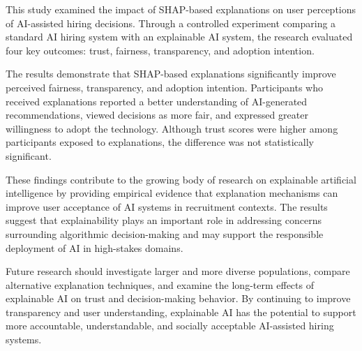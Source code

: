 \documentclass[conference]{IEEEtran}
\begin{document}
This study examined the impact of SHAP-based explanations on user perceptions of AI-assisted hiring decisions. Through a controlled experiment comparing a standard AI hiring system with an explainable AI system, the research evaluated four key outcomes: trust, fairness, transparency, and adoption intention.

The results demonstrate that SHAP-based explanations significantly improve perceived fairness, transparency, and adoption intention. Participants who received explanations reported a better understanding of AI-generated recommendations, viewed decisions as more fair, and expressed greater willingness to adopt the technology. Although trust scores were higher among participants exposed to explanations, the difference was not statistically significant.

These findings contribute to the growing body of research on explainable artificial intelligence by providing empirical evidence that explanation mechanisms can improve user acceptance of AI systems in recruitment contexts. The results suggest that explainability plays an important role in addressing concerns surrounding algorithmic decision-making and may support the responsible deployment of AI in high-stakes domains.

Future research should investigate larger and more diverse populations, compare alternative explanation techniques, and examine the long-term effects of explainable AI on trust and decision-making behavior. By continuing to improve transparency and user understanding, explainable AI has the potential to support more accountable, understandable, and socially acceptable AI-assisted hiring systems.
\end{document}
